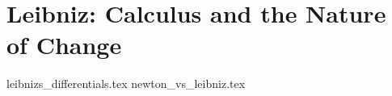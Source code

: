 \section{Leibniz: Calculus and the Nature of Change}

{leibnizs_differentials.tex}
{newton_vs_leibniz.tex}